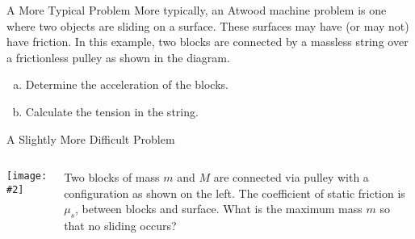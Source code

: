 \documentclass[12pt,compress,aspectratio=169]{beamer}
\newcommand{\pic}[2]{\texttt{[image: \#2]}}
\begin{document}
\begin{frame}{A More Typical Problem}
  More typically, an Atwood machine problem is one where two objects are
  sliding on a surface. These surfaces may have (or may not) have friction. In
  this example, two blocks are connected by a massless string over a
  frictionless pulley as shown in the diagram.
  \begin{center}
  \end{center}
  \vspace{-.2in}\begin{enumerate}[(a)]
  \item Determine the acceleration of the blocks.
  \item Calculate the tension in the string.
  \end{enumerate}
\end{frame}


\begin{frame}{A Slightly More Difficult Problem}
  \begin{columns}
    \pic1{graphics/pulley_prob_5}
   
    Two blocks of mass $m$ and $M$ are connected via pulley with a
    configuration as shown on the left. The coefficient of static friction is
    $\mu_s$, between blocks and surface. What is the maximum mass $m$ so that
    no sliding occurs?
  \end{columns}
\end{frame}
\end{document}
